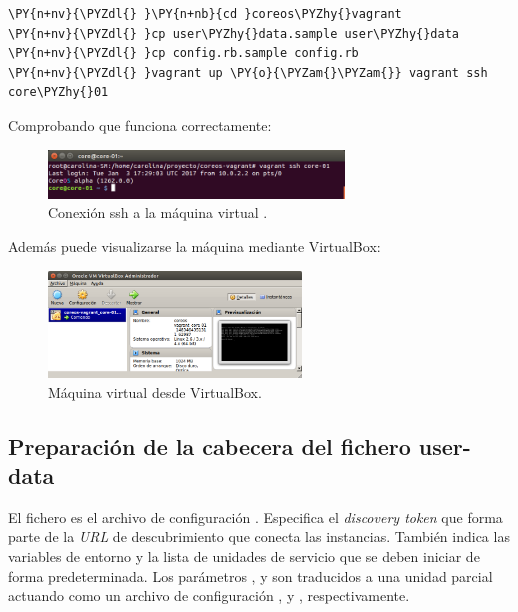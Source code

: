 \begin{framed_shaded}
\begin{Verbatim}[fontsize=\relsize{-2.5},fontseries=b,commandchars=\\\{\}]
\PY{n+nv}{\PYZdl{} }\PY{n+nb}{cd }coreos\PYZhy{}vagrant
\PY{n+nv}{\PYZdl{} }cp user\PYZhy{}data.sample user\PYZhy{}data
\PY{n+nv}{\PYZdl{} }cp config.rb.sample config.rb
\PY{n+nv}{\PYZdl{} }vagrant up \PY{o}{\PYZam{}\PYZam{}} vagrant ssh core\PYZhy{}01
\end{Verbatim}
\end{framed_shaded}

Comprobando que funciona correctamente:

\begin{figure}[H]
\centering
\includegraphics[width=0.7\textwidth]{images/figures/vagrantssh.png}
\caption{Conexión ssh a la máquina virtual .}
\end{figure}

Además puede visualizarse la máquina mediante VirtualBox:

\begin{figure}[H]
\centering
\includegraphics[width=0.6\textwidth]{images/figures/vboxcore01.png}
\caption{Máquina virtual  desde VirtualBox.}
\end{figure}

\subsection{Preparación de la cabecera del fichero user-data}

El fichero  es el archivo de configuración . Especifica el \textit{discovery token} que forma parte de la \textit{URL} de descubrimiento que conecta las instancias. También indica las variables de entorno y la lista de unidades de servicio que se deben iniciar de forma predeterminada. Los parámetros ,  y  son traducidos a una unidad  parcial actuando como un archivo de configuración ,  y , respectivamente. 

